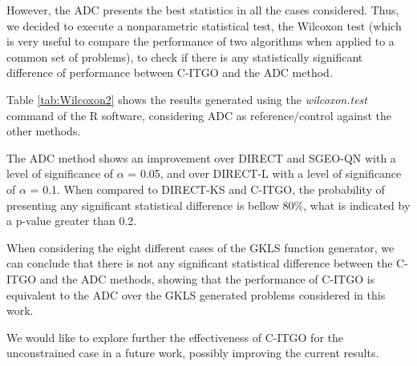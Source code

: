 However, the ADC presents the best statistics in all the cases considered. Thus, we decided to execute a nonparametric statistical test, the Wilcoxon test \citep{Friedman} (which is very useful to compare the performance of two algorithms when applied to a common set of problems), to check if there is any statistically significant difference of performance between C-ITGO and the ADC method.

Table \ref{tab:Wilcoxon2} shows the results generated using the \textit{wilcoxon.test} command of the R software, considering ADC as reference/control against the other methods. 



The ADC method shows an improvement over DIRECT and SGEO-QN with a level of significance of $\alpha$ = 0.05, and over DIRECT-L with a level of significance of $\alpha$ = 0.1. When compared to DIRECT-KS and C-ITGO, the probability of presenting any significant statistical difference is bellow 80\%, what is indicated by a p-value greater than 0.2. 

When considering the eight different cases of the GKLS function generator, we can conclude that there is not any significant statistical difference between the C-ITGO and the ADC methods, showing that the performance of C-ITGO is equivalent to the ADC over the GKLS generated problems considered in this work.

We would like to explore further the effectiveness of C-ITGO for the unconstrained case in a future work, possibly improving the current results.